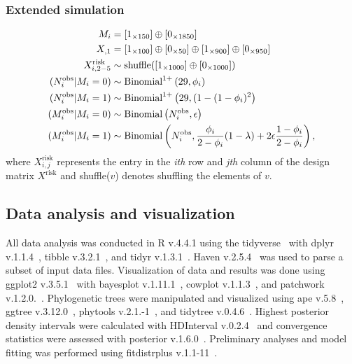 \documentclass[10pt,letterpaper]{article}
\newcommand{\MI}{M^{\text{\text{obs}}}}
\begin{document}
\subsubsection{Extended simulation}
\label{sec:extended_simulation}
\begin{subequations}
\begin{align}
M_i &= [{1}_{\times 150}] \oplus [{0}_{\times 1850}]\\
X_{,1} &= [{1}_{\times 100}] \oplus [{0}_{\times 50}] \oplus [{1}_{\times 900}] \oplus [{0}_{\times 950}]\\
X^{\text{risk}}_{i,2-5} &\sim  \text{shuffle}([{1}_{\times 1000}] \oplus [{0}_{\times 1000}]) \\
(N^{\text{obs}}_i | M_i = 0) &\sim \text{Binomial}^{1+}\left(29, \phi_i\right) \\
(N^{\text{obs}}_i | M_i = 1) &\sim \text{Binomial}^{1+}\left(29, (1-(1-\phi_i)^2\right) \\
(\MI_i | M_i = 0) &\sim \text{Binomial}\left(N^{\text{obs}}_i, \epsilon\right) \\
(\MI_i | M_i = 1) &\sim \text{Binomial}\left(N^{\text{obs}}_i, \frac{\phi_i}{2-\phi_i}(1-\lambda) + 2\epsilon\frac{1-\phi_i}{2-\phi_i}\right),
\end{align}
\end{subequations}
where $X^{\text{risk}}_{i,j}$ represents the entry in the \textit{ith} row and \textit{jth} column of the design matrix $X^{\text{risk}}$ and shuffle($v$) denotes shuffling the elements of $v$. \par

\subsection{Data analysis and visualization}
All data analysis was conducted in R v.4.4.1 \cite{R} using the tidyverse~\cite{wickham2019} with dplyr v.1.1.4~\cite{wickham2023d}, tibble v.3.2.1~\cite{muller2023}, and tidyr v.1.3.1~\cite{wickham2024}. Haven v.2.5.4~\cite{wickham2023h} was used to parse a subset of input data files. Visualization of data and results was done using ggplot2 v.3.5.1~\cite{wickham2016} with bayesplot v.1.11.1~\cite{gabry2024,gabry2019}, cowplot v.1.1.3~\cite{wilke2024}, and patchwork v.1.2.0.~\cite{pedersen2024}. Phylogenetic trees were manipulated and visualized using ape v.5.8~\cite{paradis2019}, ggtree v.3.12.0~\cite{yu2022, xu2022, yu2020, yu2018, yu2017}, phytools v.2.1.-1~\cite{revell2024}, and tidytree v.0.4.6~\cite{yu2022}. Highest posterior density intervals were calculated with HDInterval v.0.2.4~\cite{meredith2022} and convergence statistics were assessed with posterior v.1.6.0~\cite{posterior}. Preliminary analyses and model fitting was performed using fitdistrplus v.1.1-11~\cite{delignette-muller2015}. \par
\end{document}
